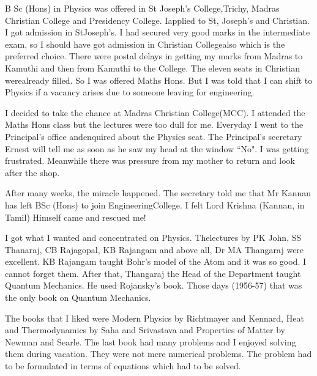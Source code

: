 B Sc (Hons) in Physics was offered in St Joseph's College,\break Trichy, 
Madras Christian College and Presidency College. I\break applied to St, 
Joseph's and Christian. I got admission in St\break Joseph's. I had secured 
very good marks in the intermediate exam, so I should have got admission 
in Christian College\break also which is the preferred choice.  There were 
postal delays in getting my marks from Madras to Kamuthi and then from\break 
Kamuthi to the College. The eleven seats in Christian were\break already 
filled. So I was offered Maths Hons. But I was told that I can shift to 
Physics if a vacancy arises due to someone leaving for engineering.

I decided to take the chance at Madras Christian College\break  (MCC). I 
attended the Maths Hons class but the lectures were too dull for me. 
Everyday I went to the Principal's office and\break enquired about the Physics 
seat. The Principal's secretary Ernest will tell me as soon as he saw my 
head at the window ``No". I was getting frustrated. Meanwhile there was 
pressure from my mother to return and look after the shop.

After many weeks, the miracle happened. The secretary told me that Mr 
Kannan has left BSc (Hons) to join Engineering\break College. I felt Lord 
Krishna (Kannan, in Tamil) Himself came and rescued me!

I got what I wanted and concentrated on Physics. The\break lectures by PK 
John, SS Thanaraj, CB Rajagopal, KB Rajangam and above all, Dr MA 
Thangaraj were excellent. KB Rajangam taught Bohr's model of the Atom 
and it was so good. I cannot forget them. After that, Thangaraj the Head 
of the Department taught Quantum Mechanics. He used Rojansky's book. 
Those days (1956-57) that was the only book on Quantum Mechanics.

The books that I liked were Modern Physics by Richtmayer and Kennard, 
Heat and Thermodynamics by Saha and Srivastava and Properties of Matter 
by Newman and Searle. The last book had many problems and I enjoyed 
solving them during vacation. They were not mere numerical problems. The 
problem had to be formulated in terms of equations which had to be 
solved.

